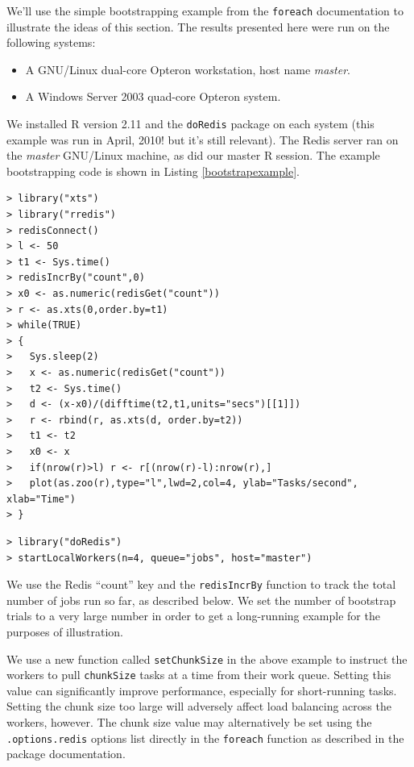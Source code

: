\documentclass[12pt]{article}
\begin{document}
We'll use the simple bootstrapping example from the {\tt foreach} documentation
to illustrate the ideas of this section. The results presented here were
run on the following systems:
\begin{itemize}
\item A GNU/Linux dual-core Opteron workstation, host name {\it master}.
\item A Windows Server 2003 quad-core Opteron system.
\end{itemize}
We installed R version 2.11 and the {\tt doRedis} package on each system (this
example was run in April, 2010! but it's still relevant).  The Redis server ran
on the {\it master} GNU/Linux machine, as did our master R session.
The example bootstrapping code is shown in Listing \ref{bootstrapexample}.

\begin{lstlisting}[float=!ht,caption=Performance Visualization,label=perfvis]
> library("xts")
> library("rredis")
> redisConnect()
> l <- 50
> t1 <- Sys.time()
> redisIncrBy("count",0)
> x0 <- as.numeric(redisGet("count"))
> r <- as.xts(0,order.by=t1)
> while(TRUE)
> {
>   Sys.sleep(2)
>   x <- as.numeric(redisGet("count"))
>   t2 <- Sys.time()
>   d <- (x-x0)/(difftime(t2,t1,units="secs")[[1]])
>   r <- rbind(r, as.xts(d, order.by=t2))
>   t1 <- t2
>   x0 <- x
>   if(nrow(r)>l) r <- r[(nrow(r)-l):nrow(r),]
>   plot(as.zoo(r),type="l",lwd=2,col=4, ylab="Tasks/second", xlab="Time")
> }
\end{lstlisting}

\begin{lstlisting}[float=!ht,caption=Adding Additional Workers,label=addingworkers]
> library("doRedis")
> startLocalWorkers(n=4, queue="jobs", host="master")
\end{lstlisting}
We use the Redis ``count'' key and the {\tt redisIncrBy} function to track the 
total number of jobs run so far, as described below. We set the number of
bootstrap trials to a very large number in order to get a long-running
example for the purposes of illustration.

We use a new function called {\tt setChunkSize} in the above example to
instruct the workers to pull {\tt chunkSize} tasks at a time from their work
queue. Setting this value can significantly improve performance, especially
for short-running tasks. Setting the chunk size too large will adversely
affect load balancing across the workers, however. The chunk size value
may alternatively be set using the {\tt .options.redis} options list 
directly in the {\tt foreach} function as described in the package
documentation.
\end{document}
